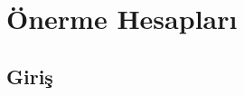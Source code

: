 \documentclass[dvipsnames]{beamer}
\theoremstyle{definition}
\theoremstyle{example}
\newtheorem{ornek}[theorem]{Örnek}
\theoremstyle{plain}
\begin{document}
%
%
%

\section{Önerme Hesapları}

\subsection{Giriş}
\end{document}
